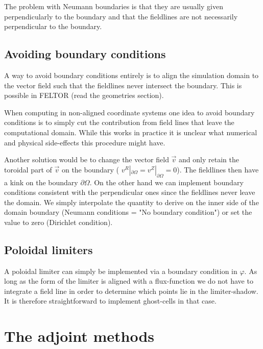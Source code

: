 The problem with Neumann boundaries is that they are usually given 
perpendicularly to the boundary and that the fieldlines are not necessarily
perpendicular to the boundary. 

\subsection{Avoiding boundary conditions}
A way to avoid boundary conditions entirely is to
align the simulation domain to the vector field such that the fieldlines
never intersect the boundary. This is possible in FELTOR (read the
geometries section).

When computing in non-aligned coordinate systems
one idea to avoid boundary conditions
is to simply cut the contribution from field lines
that leave the computational domain. While this works in practice
it is unclear what numerical and physical side-effects this procedure might have.

Another solution would be to change the 
vector field $\vec v$ and only retain the toroidal part of $\vec v$ on the 
boundary ( $v^R|_{\partial\Omega} = v^Z|_{\partial\Omega} =0$). The fieldlines then have a kink on the boundary $\partial\Omega$. 
On the other hand we can implement boundary conditions consistent with 
the perpendicular ones since the fieldlines never leave the domain. 
We simply interpolate the quantity to derive on the inner side of the
domain boundary (Neumann conditions = "No boundary condition") or 
set the value to zero (Dirichlet condition).

\subsection{Poloidal limiters}
A poloidal limiter can simply be implemented via a boundary condition in $\varphi$. 
As long as the form of the limiter is aligned with a flux-function we do not have to 
integrate a field line in order to determine which points lie in the
limiter-shadow. It is therefore straightforward to implement ghost-cells 
in that case. 


\section{The adjoint methods}
